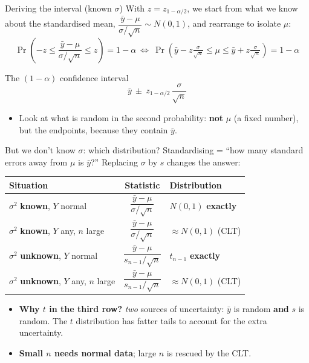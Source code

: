 \documentclass[
  11pt,
  ignorenonframetext,
  aspectratio=169,
]{beamer}
\providecommand{\tightlist}{%
  \setlength{\itemsep}{0pt}\setlength{\parskip}{0pt}}
\renewcommand{\arraystretch}{1.25}
\begin{document}
\begin{frame}{Deriving the interval (known \(\sigma\))}
\protect{}\label{deriving-the-interval-known-sigma}
With \(z=z_{1-\alpha/2}\), we start from what we know about the
standardised mean, \(\dfrac{\bar y-\mu}{\sigma/\sqrt n}\sim N(0,1)\), and
rearrange to isolate \(\mu\):
\[\Pr\!\left(-z\le\frac{\bar y-\mu}{\sigma/\sqrt n}\le z\right)=1-\alpha
\ \Longleftrightarrow\
\Pr\!\left(\bar y-z\tfrac{\sigma}{\sqrt n}\le\mu\le\bar y+z\tfrac{\sigma}{\sqrt n}\right)=1-\alpha\]

\begin{block}{The \((1-\alpha)\) confidence interval}
\[\bar y\ \pm\ z_{1-\alpha/2}\,\frac{\sigma}{\sqrt n}\]
\end{block}

\begin{itemize}
\tightlist
\item
  Look at what is random in the second probability: \textbf{not}
  \(\mu\) (a fixed number), but the endpoints, because they contain
  \(\bar y\).
\end{itemize}
\end{frame}

\begin{frame}[shrink=1]{But we don't know \(\sigma\): which distribution?}
\protect\phantomsection\label{which-distribution-does-the-standardised-mean-follow}
Standardising = ``how many standard errors away from \(\mu\) is
\(\bar y\)?'' Replacing \(\sigma\) by \(s\) changes the answer:

{\renewcommand{\arraystretch}{2}
\begin{tabular}{@{}lcl@{}}
  \toprule
  Situation & Statistic & Distribution \\
  \midrule
  $\sigma^2$ \textbf{known}, $Y$ normal
    & $\dfrac{\bar y-\mu}{\sigma/\sqrt n}$     & $N(0,1)$ \textbf{exactly} \\
  $\sigma^2$ \textbf{known}, $Y$ any, $n$ large
    & $\dfrac{\bar y-\mu}{\sigma/\sqrt n}$     & $\approx N(0,1)$ (CLT) \\
  $\sigma^2$ \textbf{unknown}, $Y$ normal
    & $\dfrac{\bar y-\mu}{s_{n-1}/\sqrt n}$    & $t_{n-1}$ \textbf{exactly} \\
  $\sigma^2$ \textbf{unknown}, $Y$ any, $n$ large
    & $\dfrac{\bar y-\mu}{s_{n-1}/\sqrt n}$    & $\approx N(0,1)$ (CLT) \\
  \bottomrule
\end{tabular}}

\smallskip
\begin{itemize}
\tightlist
\item
  \textbf{Why \(t\) in the third row?} \emph{two} sources of uncertainty: \(\bar y\) is random \textbf{and} \(s\) is random. The \(t\) distribution has fatter tails to account for the extra uncertainty.
\item
  \textbf{Small \(n\) needs normal data}; large \(n\) is rescued by the CLT.
\end{itemize}
\end{frame}
\end{document}
